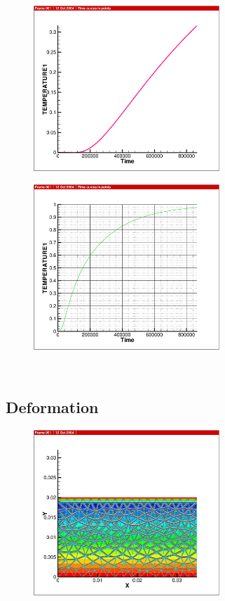 {\begin{figure}[htb!]
  \includegraphics[width=7cm]{figures/ht_hex.eps}\\
\end{figure}

\begin{figure}[htb!]
  \includegraphics[width=7cm]{figures/ht_pris.eps}\\
\end{figure}

\newpage $ $ \newpage
\subsection{Deformation}

\begin{figure}[htb!]
  \includegraphics[width=7cm]{figures/m_cc_tri.eps}\\
\end{figure}

}
